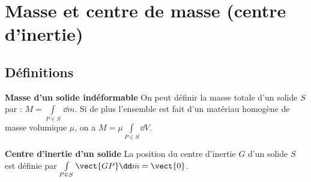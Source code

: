 \def\xxactivite{Cours}
\def\xxauteur{\textsl{Xavier Pessoles}}

\fichefalse
\proftrue
\tdfalse
\courstrue

\def\xxnumchapitre{Chapitre 3 \vspace{.2cm}}
\def\xxchapitre{\hspace{.12cm} Caractérisation inertielle des solides}

\def\xxcompetences{%
\textsl{%
\textbf{Savoirs et compétences :}\\
\begin{itemize}[label=\ding{112},font=\color{ocre}] 
\item B2-10 : Déterminer les caractéristiques d'un solide ou d'un ensemble de solides indéformables.
\end{itemize}
}}


\def\xxfigures{
\texttt{[image: fig\_01]}\\
\textit{Toupie}

\texttt{[image: fig\_02]}\\
\textit{Volants d'inertie d'un vilebrequin}
}%



\setlength{\columnseprule}{.1pt}

\vspace{2cm}
\pagestyle{fancy}
\thispagestyle{plain}


\section{Masse et centre de masse (centre d'inertie)}
\subsection{Définitions}
\begin{defi}\textbf{Masse d'un solide indéformable}
On peut définir la masse totale d'un solide $S$ par : $M=\int\limits_{P\in S} \,\dd m$. Si de plus l'ensemble est fait d'un matériau homogène de masse volumique $\mu$, on a $M=\mu \int\limits_{P\in S} \dd V$. \end{defi}


\begin{defi}\textbf{Centre d'inertie d'un solide}
La position du centre d'inertie $G$ d'un solide $S$ est définie par $\int\limits_{P\in S} \vect{GP} \dd m = \vect{0}$.
\end{defi}

